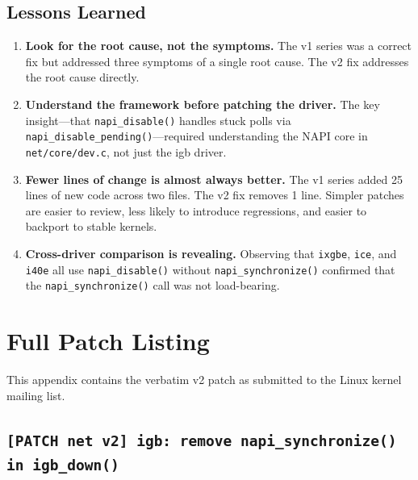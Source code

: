 \documentclass[11pt,a4paper,openany]{book}
\newcommand{\func}[1]{\texttt{#1()}}
\newcommand{\file}[1]{\texttt{#1}}
\begin{document}
\section{Lessons Learned}

\begin{enumerate}
\item \textbf{Look for the root cause, not the symptoms.}  The v1
    series was a correct fix but addressed three symptoms of a single
    root cause.  The v2 fix addresses the root cause directly.

\item \textbf{Understand the framework before patching the driver.}
    The key insight---that \func{napi\_disable} handles stuck polls via
    \func{napi\_disable\_pending}---required understanding the NAPI
    core in \file{net/core/dev.c}, not just the igb driver.

\item \textbf{Fewer lines of change is almost always better.}  The v1
    series added 25 lines of new code across two files.  The v2 fix
    removes 1 line.  Simpler patches are easier to review, less likely
    to introduce regressions, and easier to backport to stable kernels.

\item \textbf{Cross-driver comparison is revealing.}  Observing that
    \texttt{ixgbe}, \texttt{ice}, and \texttt{i40e} all use
    \func{napi\_disable} without \func{napi\_synchronize} confirmed
    that the \func{napi\_synchronize} call was not load-bearing.
\end{enumerate}


\appendix

\chapter{Full Patch Listing}
\label{app:patches}

This appendix contains the verbatim v2 patch as submitted to the Linux
kernel mailing list.

\section{\texttt{[PATCH net v2] igb: remove napi\_synchronize() in igb\_down()}}
\end{document}
